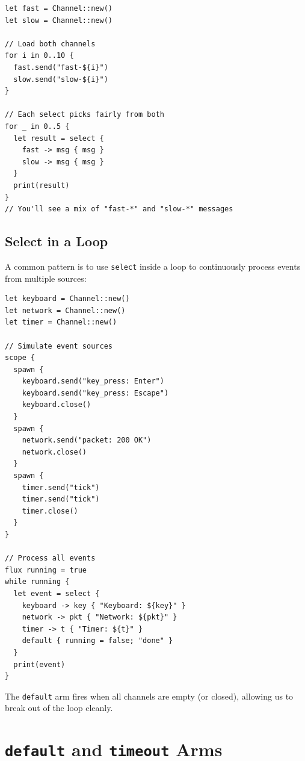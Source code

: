 \begin{lstlisting}[language=Lattice, caption={Fairness in select}]
let fast = Channel::new()
let slow = Channel::new()

// Load both channels
for i in 0..10 {
  fast.send("fast-${i}")
  slow.send("slow-${i}")
}

// Each select picks fairly from both
for _ in 0..5 {
  let result = select {
    fast -> msg { msg }
    slow -> msg { msg }
  }
  print(result)
}
// You'll see a mix of "fast-*" and "slow-*" messages
\end{lstlisting}

\subsection{Select in a Loop}

A common pattern is to use \lstinline|select| inside a loop to continuously process events from multiple sources:

\begin{lstlisting}[language=Lattice, caption={Event loop with select}]
let keyboard = Channel::new()
let network = Channel::new()
let timer = Channel::new()

// Simulate event sources
scope {
  spawn {
    keyboard.send("key_press: Enter")
    keyboard.send("key_press: Escape")
    keyboard.close()
  }
  spawn {
    network.send("packet: 200 OK")
    network.close()
  }
  spawn {
    timer.send("tick")
    timer.send("tick")
    timer.close()
  }
}

// Process all events
flux running = true
while running {
  let event = select {
    keyboard -> key { "Keyboard: ${key}" }
    network -> pkt { "Network: ${pkt}" }
    timer -> t { "Timer: ${t}" }
    default { running = false; "done" }
  }
  print(event)
}
\end{lstlisting}

The \lstinline|default| arm fires when all channels are empty (or closed), allowing us to break out of the loop cleanly.

\section{\texttt{default} and \texttt{timeout} Arms}\label{sec:select-default-timeout}


